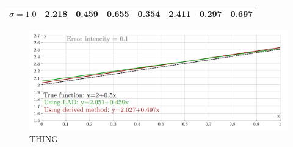 \begin{table}[h!]
\begin{tabular}{|c|r|r|r|r|r|r|r|}
$\sigma = 1.0$                                                                & 2.218                            & 0.459                            & 0.655                                                                         & 0.354                                                                        & 2.411                            & 0.297                            & 0.697                                                                        \\ \hline
\end{tabular}
\egroup
\end{table}

\begin{figure}[h!]
\includegraphics[scale=0.35]{updated/table-1c0.1}
\centering
\caption{THING}
\end{figure}
